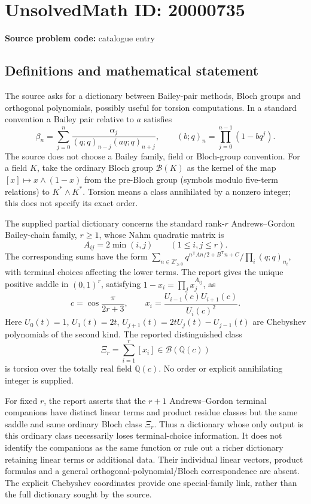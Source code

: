 \documentclass[11pt]{article}
\newcommand{\Z}{\mathbb{Z}}
\newcommand{\Q}{\mathbb{Q}}
\begin{document}
\section*{UnsolvedMath ID: 20000735}
\textbf{Source problem code:} catalogue entry
\subsection{Definitions and mathematical statement}
The source asks for a dictionary between Bailey-pair methods, Bloch groups and orthogonal polynomials, possibly useful for torsion computations. In a standard convention a Bailey pair relative to \(a\) satisfies
\[
 \beta_n=\sum_{j=0}^n\frac{\alpha_j}{(q;q)_{n-j}(aq;q)_{n+j}},
 \qquad (b;q)_n=\prod_{j=0}^{n-1}(1-bq^j).
\]
The source does not choose a Bailey family, field or Bloch-group convention. For a field \(K\), take the ordinary Bloch group \(\mathcal B(K)\) as the kernel of the map \([x]\mapsto x\wedge(1-x)\) from the pre-Bloch group (symbols modulo five-term relations) to \(K^*\wedge K^*\). Torsion means a class annihilated by a nonzero integer; this does not specify its exact order.

The supplied partial dictionary concerns the standard rank-\(r\) Andrews--Gordon Bailey-chain family, \(r\ge1\), whose Nahm quadratic matrix is
\[
 A_{ij}=2\min(i,j)\qquad(1\le i,j\le r).
\]
The corresponding sums have the form \(\sum_{n\in\Z_{\ge0}^r}q^{n^{\mathsf T}An/2+B^{\mathsf T}n+C}/\prod_i(q;q)_{n_i}\), with terminal choices affecting the lower terms. The report gives the unique positive saddle in \((0,1)^r\), satisfying \(1-x_i=\prod_jx_j^{A_{ij}}\), as
\[
 c=\cos\frac\pi{2r+3},\qquad
 x_i=\frac{U_{i-1}(c)U_{i+1}(c)}{U_i(c)^2}.
\]
Here \(U_0(t)=1\), \(U_1(t)=2t\), \(U_{j+1}(t)=2tU_j(t)-U_{j-1}(t)\) are Chebyshev polynomials of the second kind. The reported distinguished class
\[
 \Xi_r=\sum_{i=1}^r[x_i]\in\mathcal B(\Q(c))
\]
is torsion over the totally real field \(\Q(c)\). No order or explicit annihilating integer is supplied.

For fixed \(r\), the report asserts that the \(r+1\) Andrews--Gordon terminal companions have distinct linear terms and product residue classes but the same saddle and same ordinary Bloch class \(\Xi_r\). Thus a dictionary whose only output is this ordinary class necessarily loses terminal-choice information. It does not identify the companions as the same function or rule out a richer dictionary retaining linear terms or additional data. Their individual linear vectors, product formulas and a general orthogonal-polynomial/Bloch correspondence are absent. The explicit Chebyshev coordinates provide one special-family link, rather than the full dictionary sought by the source.
\end{document}
